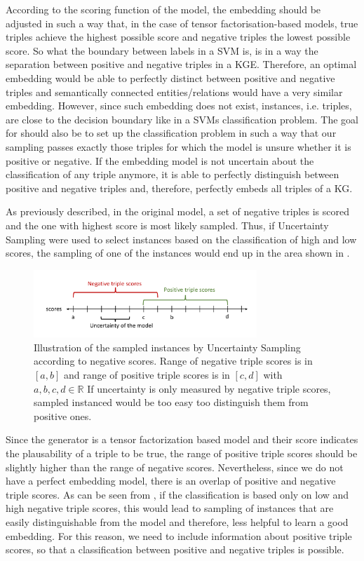According to the scoring function of the model, the embedding should be adjusted in such a way that, in the case of tensor factorisation-based models, true triples achieve the highest possible score and negative triples the lowest possible score.
So what the boundary between labels in a \ac{SVM} is, is in a way the separation between positive and negative triples in a \ac{KGE}.
Therefore, an optimal embedding would be able to perfectly distinct between positive and negative triples and semantically connected entities/relations would have a very similar embedding.
However, since such embedding does not exist, instances, i.e. triples, are close to the decision boundary like in a \acp{SVM} classification problem.
The goal for \ucgan should also be to set up the classification problem in such a way that our sampling passes  exactly those triples for which the model is unsure whether it is positive or negative.
If the embedding model is not uncertain about the classification of any triple anymore, it is able to perfectly distinguish between positive and negative triples and, therefore, perfectly embeds all triples of a \ac{KG}.

As previously described, in the original \kbgan model, a set of negative triples is scored and the one with highest score is most likely sampled.
Thus, if Uncertainty Sampling were used to select instances based on the classification of high and low scores, the sampling of one of the instances would end up in the area shown in .
\begin{figure}[t]
  \centering
    \includegraphics[width=0.75\textwidth]{figures/badVsGoodApproach.pdf}
  \caption{Illustration of the sampled instances by Uncertainty Sampling according to negative scores.
  Range of negative triple scores is in $[a, b]$ and range of positive triple scores is in  $[c, d]$ with $a,b,c,d \in \mathbb{R}$
  If uncertainty is only measured by negative triple scores, sampled instanced would be too easy too distinguish them from positive ones.}
  \label{fig:badVsGoodApproach}
\end{figure}
Since the generator is a tensor factorization based model and their score indicates the plausability of a triple to be true, the range of positive triple scores should be slightly higher than the range of negative scores.
Nevertheless, since we do not have a perfect embedding model, there is an overlap of positive and negative triple scores.
As can be seen from , if the classification is based only on low and high negative triple scores, this would lead to sampling of instances that are easily distinguishable from the model and therefore, less helpful to learn a good embedding.
For this reason, we need to include information about positive triple scores, so that a classification between positive and negative triples is possible.


